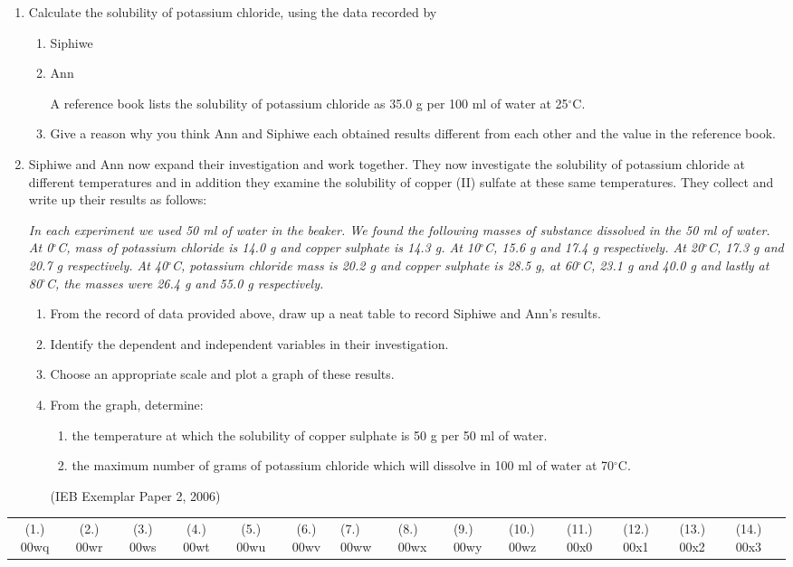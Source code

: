 {\begin{enumerate}
\item{Calculate the solubility of potassium chloride, using the data recorded by}
\begin{enumerate}
\item{Siphiwe}
\item{Ann}


A reference book lists the solubility of potassium chloride as 35.0 g per 100 ml of water at 25$^{\circ}$C.
\item{Give a reason why you think Ann and Siphiwe each obtained results different from each other and the value in the reference book.}
\end{enumerate}

\item{Siphiwe and Ann now expand their investigation and work together. They now investigate the solubility of potassium chloride at different temperatures and in addition they examine the solubility of copper (II) sulfate at these same temperatures. They collect and write up their results as follows:}

\textit{In each experiment we used 50 ml of water in the beaker. We found the following masses of substance dissolved  in the 50 ml of water. At 0$^{\circ}$C, mass of potassium chloride is 14.0 g and copper sulphate is 14.3 g. At 10$^{\circ}$C, 15.6 g and 17.4 g respectively. At 20$^{\circ}$C, 17.3 g and 20.7 g respectively. At 40$^{\circ}$C, potassium chloride mass is 20.2 g and copper sulphate is 28.5 g, at 60$^{\circ}$C, 23.1 g and 40.0 g and lastly at 80$^{\circ}$C, the masses were 26.4 g and 55.0 g respectively.}

\begin{enumerate}
\item{From the record of data provided above, draw up a neat table to record Siphiwe and Ann's results.}
\item{Identify the dependent and independent variables in their investigation.}
\item{Choose an appropriate scale and plot a graph of these results.}
\item{From the graph, determine:}
\begin{enumerate}
\item{the temperature at which the solubility of copper sulphate is 50 g per 50 ml of water.}
\item{the maximum number of grams of potassium chloride which will dissolve in 100 ml of water at 70$^{\circ}$C.}
\end{enumerate}
(IEB Exemplar Paper 2, 2006)
\end{enumerate}
\end{enumerate}
\practiceinfo

\begin{tabular}[h]{cccccc}
(1.) 00wq & (2.) 00wr & (3.) 00ws & (4.) 00wt & (5.) 00wu & (6.) 00wv & (7.) 00ww & (8.) 00wx & (9.) 00wy & (10.) 00wz & (11.) 00x0 & (12.) 00x1 & (13.) 00x2 & (14.) 00x3 & 
 \end{tabular}
}

